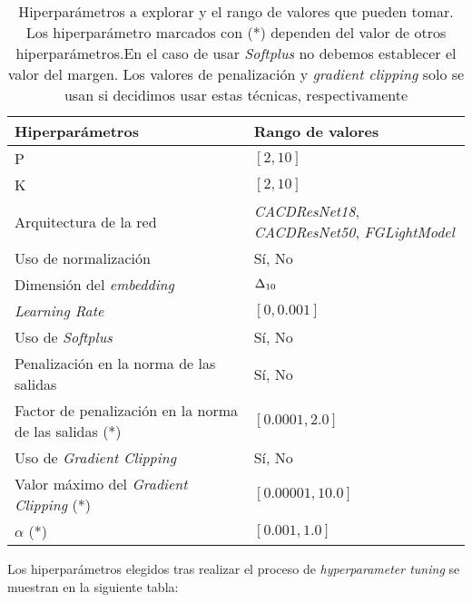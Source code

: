 \begin{table}[H]
\centering
    \begin{tabular}{|l|l|}
    \hline
    \textbf{Hiperparámetros} & \textbf{Rango de valores} \\
    \hline

    P & $[2, 10]$ \\
    K & $[2, 10]$ \\
    Arquitectura de la red & \textit{CACDResNet18}, \textit{CACDResNet50}, \textit{FGLightModel} \\
    Uso de normalización & Sí, No \\
    Dimensión del \textit{embedding} & $\Delta_{10}$ \\
    \textit{Learning Rate} & $[0, 0.001]$ \\
    Uso de \textit{Softplus} & Sí, No \\
    Penalización en la norma de las salidas & Sí, No \\
    Factor de penalización en la norma de las salidas (*) & $[0.0001, 2.0]$ \\
    Uso de \textit{Gradient Clipping} & Sí, No \\
    Valor máximo del \textit{Gradient Clipping} (*) & $[0.00001, 10.0]$ \\
    $\alpha$ (*) & $[0.001, 1.0]$ \\

    \hline

\end{tabular}
\caption{Hiperparámetros a explorar y el rango de valores que pueden tomar. Los hiperparámetro marcados con (*) dependen del valor de otros hiperparámetros.En el caso de usar \textit{Softplus} no debemos establecer el valor del margen. Los valores de penalización y \textit{gradient clipping} solo se usan si decidimos usar estas técnicas, respectivamente}
\end{table}


Los hiperparámetros elegidos tras realizar el proceso de \textit{hyperparameter tuning} se muestran en la siguiente tabla:

